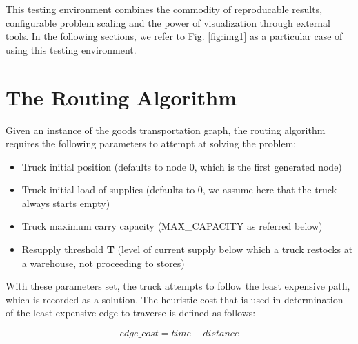 \documentclass[journal,onecolumn]{IEEEtran}
\begin{document}
This testing environment combines the commodity of reproducable results, configurable problem scaling and the power of visualization through external tools. In the following sections, we refer to Fig. \ref{fig:img1} as a particular case of using this testing environment.

\section{The Routing Algorithm}

Given an instance of the goods transportation graph, the routing algorithm requires the following parameters to attempt at solving the problem:
\begin{itemize}
	\item{Truck initial position (defaults to node 0, which is the first generated node)}
	\item{Truck initial load of supplies (defaults to 0, we assume here that the truck always starts empty)}
	\item{Truck maximum carry capacity (MAX\_CAPACITY as referred below)}
	\item{Resupply threshold \textbf{T} (level of current supply below which a truck restocks at a warehouse, not proceeding to stores)}
\end{itemize}

With these parameters set, the truck attempts to follow the least expensive path, which is recorded as a solution. The heuristic cost that is used in determination of the least expensive edge to traverse is defined as follows: 

\begin{equation*}
edge\_cost = time + distance
\end{equation*}
\end{document}
